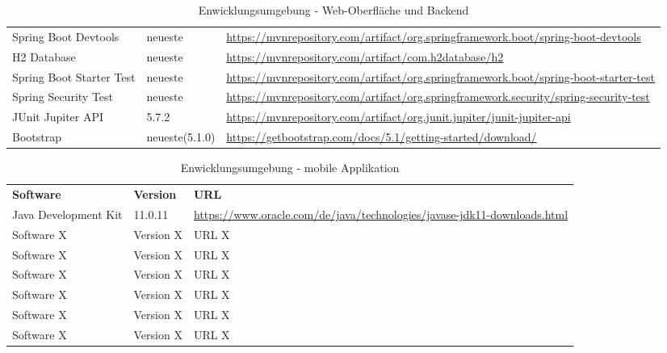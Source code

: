 \begin{table}[h]
\begin{tabularx}{\textwidth}{l l X}
        \rowcolor[HTML]{E7E7E7} 
            Spring Boot Devtools & neueste & \url{https://mvnrepository.com/artifact/org.springframework.boot/spring-boot-devtools} \\
        \rowcolor[HTML]{E7E7E7} 
            H2 Database & neueste & \url{https://mvnrepository.com/artifact/com.h2database/h2} \\
        \rowcolor[HTML]{E7E7E7} 
            Spring Boot Starter Test & neueste & \url{https://mvnrepository.com/artifact/org.springframework.boot/spring-boot-starter-test} \\
        \rowcolor[HTML]{E7E7E7} 
            Spring Security Test & neueste & \url{https://mvnrepository.com/artifact/org.springframework.security/spring-security-test} \\
        \rowcolor[HTML]{E7E7E7} 
            JUnit Jupiter API & 5.7.2 & \url{https://mvnrepository.com/artifact/org.junit.jupiter/junit-jupiter-api} \\
        \rowcolor[HTML]{E7E7E7} 
		    Bootstrap & neueste(5.1.0) & \url{https://getbootstrap.com/docs/5.1/getting-started/download/} \\
	\end{tabularx}
	\caption{Enwicklungsumgebung - Web-Oberfl\"ache und Backend}
	\label{table:entwicklungsumgebung}
\end{table}

\begin{table}[h]
	\centering
	\begin{tabularx}{\textwidth}{l l X}
		\rowcolor[HTML]{C0C0C0} 
		\textbf{Software} & \textbf{Version} & \textbf{URL} \\
		Java Development Kit & 11.0.11 & \url{https://www.oracle.com/de/java/technologies/javase-jdk11-downloads.html} \\
		\rowcolor[HTML]{E7E7E7} 
		Software X & Version X & URL X \\
		Software X & Version X & URL X \\
		\rowcolor[HTML]{E7E7E7} 
		Software X & Version X & URL X \\
		Software X & Version X & URL X \\
		\rowcolor[HTML]{E7E7E7} 
		Software X & Version X & URL X \\
		Software X & Version X & URL X \\
	\end{tabularx}
	\caption{Enwicklungsumgebung - mobile Applikation}
	\label{table:entwicklungsumgebung}
\end{table}